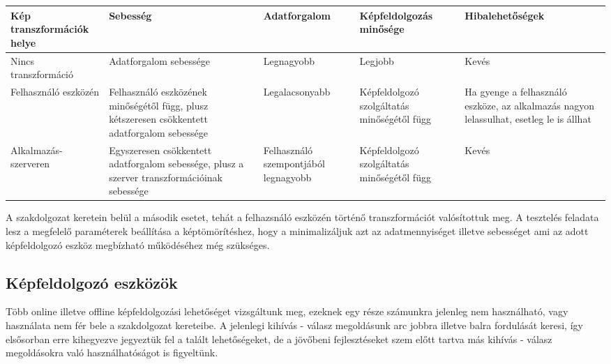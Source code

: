 \begin{center}
	\begin{tabular}{|p{2cm}|p{3cm} |p{3cm} | p{3cm}|p{3cm}|}
   	\hline
	\textbf{Kép transzformációk helye} & \textbf{Sebesség} & \textbf{Adatforgalom} & \textbf{Képfeldolgozás minősége} &\textbf{ Hibalehetőségek} \\ \hline
	Nincs transzformáció & Adatforgalom sebessége & Legnagyobb & Legjobb & Kevés \\ \hline
	Felhasználó eszközén & Felhasználó eszközének minőségétől függ, plusz kétszeresen csökkentett adatforgalom sebessége & Legalacsonyabb & Képfeldolgozó szolgáltatás minőségétől függ & Ha gyenge a felhasználó eszköze, az alkalmazás nagyon lelassulhat, esetleg le is állhat \\ \hline
	Alkalmazás-szerveren & Egyszeresen csökkentett adatforgalom sebessége, plusz a szerver transzformációinak sebessége & Felhasználó szempontjából legnagyobb & Képfeldolgozó szolgáltatás minőségétől függ & Kevés\\ \hline
	\end{tabular}
\end{center}

A szakdolgozat keretein belül a második esetet, tehát a felhazsnáló eszközén történő transzformációt valósítottuk meg. A tesztelés feladata lesz a megfelelő paraméterek beállítása a képtömörítéshez, hogy a minimalizáljuk azt az adatmennyiséget illetve sebességet ami az adott képfeldolgozó eszköz megbízható működéséhez még szükséges.

\subsection{Képfeldolgozó eszközök}
Több online illetve offline képfeldolgozási lehetőséget vizsgáltunk meg, ezeknek egy része számunkra jelenleg nem használható, vagy használata nem fér bele a szakdolgozat kereteibe. A jelenlegi kihívás - válasz megoldásunk arc jobbra illetve balra fordulását keresi, így elsősorban erre kihegyezve jegyeztük fel a talált lehetőségeket, de a jövőbeni fejlesztéseket szem előtt tartva más kihívás - válasz megoldásokra való használhatóságot is figyeltünk.

\newpage